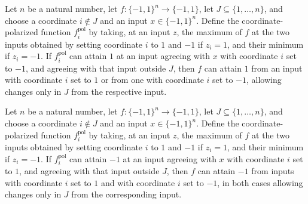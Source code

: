 \begin{theorem}
\label{FABL.coalitionCanAttain_coordinatePolarization_one_set_neg_one_imp}
\leanok
{}
Let $n$ be a natural number, let $f\colon\{−1,1\}^n\to\{−1,1\}$, let
$J\subseteq\{1,\ldots,n\}$, and choose a coordinate $i\notin J$ and an input
$x\in\{−1,1\}^n$. Define the coordinate-polarized function $f_i^{\mathrm{pol}}$ by
taking, at an input $z$, the maximum of $f$ at the two inputs obtained by setting
coordinate $i$ to $1$ and $-1$ if $z_i=1$, and their minimum if $z_i=-1$. If
$f_i^{\mathrm{pol}}$ can attain $1$ at an input agreeing with $x$ with coordinate $i$
set to $-1$, and agreeing with that input outside $J$, then $f$ can attain $1$ from an
input with coordinate $i$ set to $1$ or from one with coordinate $i$ set to $-1$,
allowing changes only in $J$ from the respective input.
\end{theorem}

\begin{theorem}
\label{FABL.coalitionCanAttain_coordinatePolarization_neg_one_set_one_imp}
\leanok
{}
Let $n$ be a natural number, let $f\colon\{−1,1\}^n\to\{−1,1\}$, let
$J\subseteq\{1,\ldots,n\}$, and choose a coordinate $i\notin J$ and an input
$x\in\{−1,1\}^n$. Define the coordinate-polarized function $f_i^{\mathrm{pol}}$ by
taking, at an input $z$, the maximum of $f$ at the two inputs obtained by setting
coordinate $i$ to $1$ and $-1$ if $z_i=1$, and their minimum if $z_i=-1$. If
$f_i^{\mathrm{pol}}$ can attain $-1$ at an input agreeing with $x$ with coordinate $i$
set to $1$, and agreeing with that input outside $J$, then $f$ can attain $-1$ from
inputs with coordinate $i$ set to $1$ and with coordinate $i$ set to $-1$, in both cases
allowing changes only in $J$ from the corresponding input.
\end{theorem}

